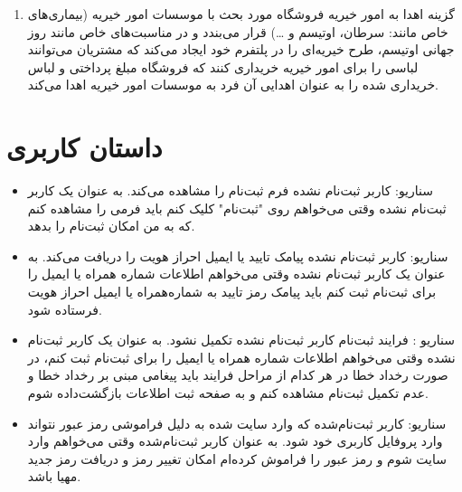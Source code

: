 \documentclass[14pt]{article}
\begin{document}
\begin{flushright}
\begin{enumerate}
\item گزینه اهدا به امور خیریه
\newline
فروشگاه مورد بحث با موسسات امور خیریه (بیماری‌های خاص مانند: سرطان، اوتیسم و …) قرار می‌بندد و در مناسبت‌های خاص مانند روز جهانی اوتیسم، طرح خیریه‌ای را در پلتفرم خود ایجاد می‌کند که مشتریان می‌توانند لباسی را برای امور خیریه خریداری کنند که فروشگاه مبلغ پرداختی و لباس خریداری شده را به عنوان اهدایی آن فرد به موسسات امور خیریه اهدا می‌کند.
\end{enumerate}
\section{داستان کاربری}


\begin{itemize}
\item سناریو: کاربر ثبت‌نام نشده فرم ثبت‌نام را مشاهده می‌کند.
\newline
به عنوان یک کاربر ثبت‌نام نشده
\newline
وقتی می‌خواهم روی "ثبت‌نام" کلیک کنم
\newline
باید فرمی را مشاهده کنم که به من امکان ثبت‌نام را بدهد.  

\item سناریو: کاربر ثبت‌نام نشده پیامک تایید یا ایمیل احراز هویت را دریافت می‌کند.
\newline
به عنوان یک کاربر ثبت‌نام نشده
\newline
وقتی می‌خواهم اطلاعات شماره همراه یا ایمیل را برای ثبت‌نام ثبت کنم
\newline
باید پیامک رمز تایید به شماره‌همراه یا ایمیل احراز هویت فرستاده شود.

\item سناریو :‌ فرایند ثبت‌نام کاربر ثبت‌نام نشده تکمیل نشود.
\newline
به عنوان یک کاربر ثبت‌نام نشده
\newline
وقتی می‌خواهم اطلاعات شماره همراه یا ایمیل را برای ثبت‌نام ثبت کنم، در صورت رخداد خطا در هر کدام از مراحل فرایند
\newline
باید پیغامی مبنی بر رخداد خطا و عدم تکمیل ثبت‌نام مشاهده کنم و به صفحه ثبت اطلاعات بازگشت‌داده شوم.
\item سناریو: کاربر ثبت‌نام‌شده که وارد سایت شده به دلیل فراموشی رمز عبور نتواند وارد پروفایل کاربری خود شود.
\newline
به عنوان کاربر ثبت‌نام‌شده
\newline
وقتی می‌خواهم وارد سایت شوم و رمز عبور را فراموش کرده‌ام
\newline
امکان تغییر رمز و دریافت رمز جدید مهیا باشد.


\end{itemize}
\end{flushright}
\end{document}
